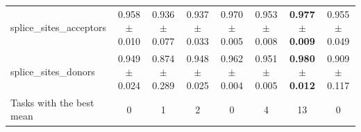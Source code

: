 \begin{tabular}{lccccccc}
splice\_sites\_acceptors & 0.958{\scriptsize$\,\pm\,$0.010} & 0.936{\scriptsize$\,\pm\,$0.077} & 0.937{\scriptsize$\,\pm\,$0.033} & 0.970{\scriptsize$\,\pm\,$0.005} & 0.953{\scriptsize$\,\pm\,$0.008} & \textbf{0.977{\scriptsize$\,\pm\,$0.009}} & 0.955{\scriptsize$\,\pm\,$0.049} \\
splice\_sites\_donors & 0.949{\scriptsize$\,\pm\,$0.024} & 0.874{\scriptsize$\,\pm\,$0.289} & 0.948{\scriptsize$\,\pm\,$0.025} & 0.962{\scriptsize$\,\pm\,$0.004} & 0.951{\scriptsize$\,\pm\,$0.005} & \textbf{0.980{\scriptsize$\,\pm\,$0.012}} & 0.909{\scriptsize$\,\pm\,$0.117} \\
\midrule
Tasks with the best mean & 0 & 1 & 2 & 0 & 4 & 13 & 0 \\
\bottomrule
\end{tabular}
